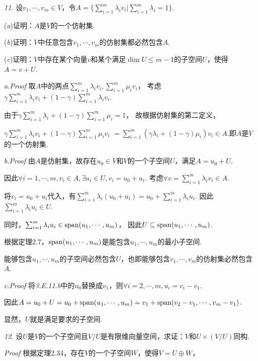 \textit{11.}
设\(v_1,\cdots,v_m \in V\)，令\(A=\{\sum_{i=1}^m \lambda_i v_i|\sum_{i=1}^m \lambda_i=1\}\).

(\textit{a})证明：\(A\)是\(V\)的一个仿射集.

(\textit{b})证明：\(V\)中任意包含\(v_1,\cdots,v_m\)的仿射集都必然包含\(A\).

(\textit{c})证明：\(V\)中存在某个向量\(v\)和某个满足\(\dim U \leq m-1\)的子空间\(U\)，使得\(A=v+U\).

\textit{a.Proof}
取\(A\)中的两点\(\sum_{i=1}^m \lambda_i v_i,\sum_{i=1}^m \mu_i v_i\)，
考虑\(\gamma \sum_{i=1}^m \lambda_i v_i+(1-\gamma)\sum_{i=1}^m \lambda_i v_i\).

由于\(\gamma \sum_{i=1}^m \lambda_i+(1-\gamma)\sum_{i=1}^m \mu_i=1\)，
故根据仿射集的第二定义，

\(\gamma \sum_{i=1}^m \lambda_i v_i+(1-\gamma)\sum_{i=1}^m \mu_i v_i\)
\(=\sum_{i=1}^m(\gamma \lambda_i+(1-\gamma)\mu_i)v_i \in A\).即\(A\)是\(V\)的一个仿射集.

\textit{b.Proof}
由\(A\)是仿射集，故存在\(u_0 \in V\)和\(V\)的一个子空间\(U\)，满足\(A=u_0+U\).

因此\(\forall i=1,\cdots,m,v_i \in A,\exists u_i \in U,v_i=u_0+u_i\).
考虑\(\forall v=\sum_{i=1}^m \lambda_i v_i \in A\).

将\(v_i=u_0+u_i\)代入，有\(\sum_{i=1}^m \lambda_i(u_0+u_i)=u_0+\sum_{i=1}^m \lambda_i u_i\).
因此\(\sum_{i=1}^m \lambda_i u_i \in U\).

同时，\(\sum_{i=1}^m \lambda_i u_i \in \mathrm{span} (u_1,\cdots,u_m)\)，
因此\(U \subseteq \mathrm{span} (u_1,\cdots,u_m)\).

根据定理2.7，\(\mathrm{span} (u_1,\cdots,u_m)\)是能包含\(u_1,\cdots,u_m\)的最小子空间.

能够包含\(u_1,\cdots,u_m\)的子空间必然包含\(U\)，也即能够包含\(v_1,\cdots,v_m\)的仿射集必然包含\(A\).

\textit{c.Proof}
将\textit{3.E.11.b}中的\(u_0\)替换成\(v_1\)，则\(\forall i=2,\cdots,m,u_i=v_i-v_1\).

因此\(A=u_0+U=u_0+\mathrm{span} (u_1,\cdots,u_m)=v_1+\mathrm{span} (v_2-v_1,\cdots,v_m-v_1)\).

显然，\(U\)就是满足要求的子空间.

\hspace*{\fill}

\textit{12.}
设\(U\)是\(V\)的一个子空间且\(V/U\)是有限维向量空间，求证：\(V\)和\(U \times (V/U)\)同构.

\textit{Proof}
根据定理2.34，存在\(V\)的一个子空间\(W\)，使得\(V=U \oplus W\)，

